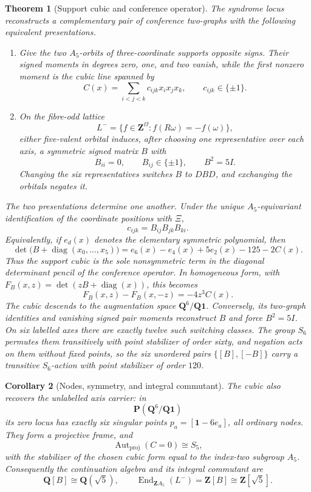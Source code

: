 \documentclass[11pt]{article}
\newtheorem{theorem}{Theorem}[section]
\newtheorem{corollary}[theorem]{Corollary}
\theoremstyle{definition}
\theoremstyle{remark}
\begin{document}
\begin{theorem}[Support cubic and conference operator]
\label{thm:conference-two-graphs}
The syndrome locus reconstructs a complementary pair of conference
two-graphs with the following equivalent presentations.
\begin{enumerate}[label=(\roman*),leftmargin=2em]
\item Give the two $A_5$-orbits of three-coordinate supports opposite
signs.  Their signed moments in degrees zero, one, and two vanish, while
the first nonzero moment is the cubic line spanned by
\[
 C(x)=\sum_{i<j<k}c_{ijk}x_ix_jx_k,\qquad c_{ijk}\in\{\pm1\}.
\]
\item On the fibre-odd lattice
\[
 L^-=\{f\in\mathbf Z^\Omega:f(R\omega)=-f(\omega)\},
\]
either five-valent orbital induces, after choosing one representative over
each axis, a symmetric signed matrix $B$ with
\[
 B_{ii}=0,\qquad B_{ij}\in\{\pm1\},\qquad B^2=5I.
\]
Changing the six representatives switches $B$ to $DBD$, and exchanging
the orbitals negates it.
\end{enumerate}
The two presentations determine one another.  Under the unique
$A_5$-equivariant identification of the coordinate positions with $\Xi$,
\[
 \boxed{c_{ijk}=B_{ij}B_{jk}B_{ki}.}
\]
Equivalently, if $e_d(x)$ denotes the elementary symmetric polynomial,
then
\[
 \boxed{\det\!\bigl(B+\operatorname{diag}(x_0,\ldots,x_5)\bigr)
 =e_6(x)-e_4(x)+5e_2(x)-125-2C(x).}
\]
Thus the support cubic is the sole nonsymmetric term in the diagonal
determinant pencil of the conference operator.
In homogeneous form, with
$F_B(x,z)=\det(zB+\operatorname{diag}(x))$, this becomes
\[
 F_B(x,z)-F_B(x,-z)=-4z^3C(x).
\]
The cubic descends to the augmentation space
$\mathbf Q^6/\mathbf Q\mathbf1$.  Conversely, its two-graph identities
and vanishing signed pair moments reconstruct $B$ and force $B^2=5I$.  On
six labelled axes there are exactly twelve such switching classes.  The
group $S_6$ permutes them transitively with point stabilizer of order
sixty, and negation acts on them without fixed points, so the six unordered
pairs $\{[B],[-B]\}$ carry a transitive $S_6$-action with point stabilizer
of order $120$.
\end{theorem}

\begin{corollary}[Nodes, symmetry, and integral commutant]
\label{cor:conference-cubic-geometry}
The cubic also recovers the unlabelled axis carrier: in
\[
 \mathbf P(\mathbf Q^6/\mathbf Q\mathbf1)
\]
its zero locus has exactly six singular points
$p_a=[\mathbf1-6e_a]$, all ordinary nodes.  They form a projective frame,
and
\[
 \operatorname{Aut}_{\mathrm{proj}}(C=0)\cong S_5,
\]
with the stabilizer of the chosen cubic form equal to the index-two subgroup
$A_5$.
Consequently the continuation algebra and its integral commutant are
\[
 \mathbf Q[B]\cong\mathbf Q(\sqrt5),\qquad
 \operatorname{End}_{\mathbf Z A_5}(L^-)=
 \mathbf Z[B]\cong\mathbf Z[\sqrt5].
\]
\end{corollary}
\end{document}
